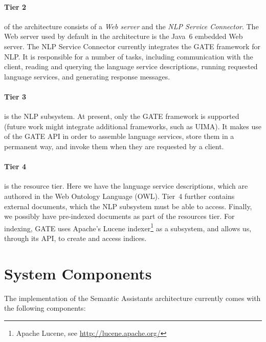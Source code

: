 \paragraph{Tier 2} of the architecture consists of a \emph{Web server}
and the \emph{NLP Service Connector}. The Web server used by default
in the architecture is the Java~6 embedded Web server.  The NLP
Service Connector currently integrates the GATE framework for NLP. It
is responsible for a number of tasks, including communication with the
client, reading and querying the language service descriptions,
running requested language services, and generating response messages.

\paragraph{Tier 3} is the NLP subsystem. At present, only the GATE
framework is supported (future work might integrate additional
frameworks, such as UIMA).  It makes use of the GATE API in order to
assemble language services, store them in a permanent way, and invoke
them when they are requested by a client.

\paragraph{Tier 4} is the resource tier.  Here we have the language
service descriptions, which are authored in the Web Ontology Language
(OWL).  Tier~4 further contains external documents, which the NLP
subsystem must be able to access. Finally, we possibly have
pre-indexed documents as part of the resources tier. For indexing,
GATE uses Apache's Lucene indexer\footnote{Apache Lucene, see
  \url{http://lucene.apache.org/}} as a subsystem, and allows us,
through its API, to create and access indices.


\section{System Components}
\label{sec:syscomp}
The implementation of the Semantic Assistants architecture currently comes
with the following components:

